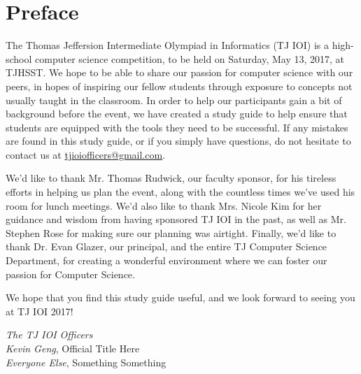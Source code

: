 \chapter{Preface}

The Thomas Jeffersion Intermediate Olympiad in Informatics (TJ IOI) is a high-school computer science competition, to be held on Saturday, May 13, 2017, at TJHSST.  We hope to be able to share our passion for computer science with our peers, in hopes of inspiring our fellow students through exposure to concepts not usually taught in the classroom.  In order to help our participants gain a bit of background before the event, we have created a study guide to help ensure that students are equipped with the tools they need to be successful.  If any mistakes are found in this study guide, or if you simply have questions, do not hesitate to contact us at \href{mailto:tjioiofficers@gmail.com}{tjioiofficers@gmail.com}.

We'd like to thank Mr. Thomas Rudwick, our faculty sponsor, for his tireless efforts in helping us plan the event, along with the countless times we've used his room for lunch meetings. We'd also like to thank Mrs. Nicole Kim for her guidance and wisdom from having sponsored TJ IOI in the past, as well as Mr. Stephen Rose for making sure our planning was airtight. Finally, we'd like to thank Dr. Evan Glazer, our principal, and the entire TJ Computer Science Department, for creating a wonderful environment where we can foster our passion for Computer Science.

We hope that you find this study guide useful, and we look forward to seeing you at TJ IOI 2017!

\textit{The TJ IOI Officers} \\
\textit{Kevin Geng}, Official Title Here \\
\textit{Everyone Else}, Something Something \\
